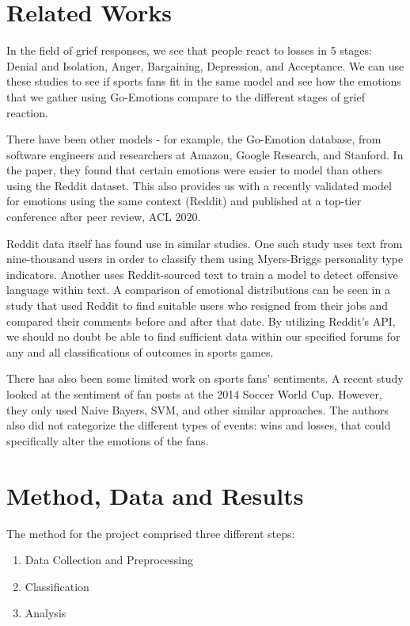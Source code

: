 \documentclass{article}
\begin{document}
\section{Related Works}

In the field of grief responses, we see that people react to losses in 5 stages: Denial and Isolation, Anger, Bargaining, Depression, and Acceptance. We can use these studies \cite{Mughal2023-rg} to see if sports fans fit in the same model and see how the emotions that we gather using Go-Emotions compare to the different stages of grief reaction.

There have been other models - for example, the Go-Emotion database, from software engineers and researchers at Amazon, Google Research, and Stanford. In the paper, they found that certain emotions were easier to model than others using the Reddit dataset\cite{demszky-etal-2020-goemotions}. This also provides us with a recently validated model for emotions using the same context (Reddit) and published at a top-tier conference after peer review, ACL 2020.

Reddit data itself has found use in similar studies. One such study uses text from nine-thousand users in order to classify them using Myers-Briggs personality type indicators\cite{gjurkovic-snajder-2018-Reddit}. Another uses Reddit-sourced text to train a model to detect offensive language within text\cite{hada-etal-2021-ruddit}. A comparison of emotional distributions can be seen in a study that used Reddit to find suitable users who resigned from their jobs and compared their comments before and after that date\cite{ireland-etal-2023-sadness}. By utilizing Reddit's API, we should no doubt be able to find sufficient data within our specified forums for any and all classifications of outcomes in sports games.

There has also been some limited work on sports fans' sentiments. A recent study \cite{iot1020014} looked at the sentiment of fan posts at the 2014 Soccer World Cup. However, they only used Naive Bayers, SVM, and other similar approaches. The authors also did not categorize the different types of events: wins and losses, that could specifically alter the emotions of the fans. 
\section{Method, Data and Results}

The method for the project comprised three different steps:
\begin{enumerate}
    \item Data Collection and Preprocessing
    \item Classification
    \item Analysis
\end{enumerate}
\end{document}
